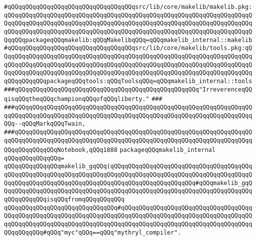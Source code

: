 \verb|#qQQqqQQqqQQqqQQqqQQqqQQqqQQqqQQqqQQqsrc/lib/core/makelib/makelib.pkg:qQQqqQQqqQQqqQQqqQQqqQQqqQQqqQQqqQQqqQQqqQQqqQQqqQQqqQQqqQQqqQQqqQQqqQQqqQQqqQQqqQQqqQQqqQQqqQQqqQQqqQQqqQQqqQQqqQQqqQQqqQQqqQQqqQQqqQQqqQQqqQQqqQQqqQQqqQQqqQQqqQQqqQQqqQQqqQQqqQQqqQQqqQQqqQQqqQQqqQQqqQQqqQQqqQQqqQQqpackageqQQqmakelib:qQQqMakelibqQQq=qQQqmakelib_internal::makelib|\newline
\verb|#qQQqqQQqqQQqqQQqqQQqqQQqqQQqqQQqqQQqsrc/lib/core/makelib/tools.pkg:qQQqqQQqqQQqqQQqqQQqqQQqqQQqqQQqqQQqqQQqqQQqqQQqqQQqqQQqqQQqqQQqqQQqqQQqqQQqqQQqqQQqqQQqqQQqqQQqqQQqqQQqqQQqqQQqqQQqqQQqqQQqqQQqqQQqqQQqqQQqqQQqqQQqqQQqqQQqqQQqqQQqqQQqqQQqqQQqqQQqqQQqqQQqqQQqqQQqqQQqqQQqqQQqqQQqqQQqqQQqqQQqpackageqQQqtools:qQQqToolsqQQq=qQQqmakelib_internal::tools|\newline
\newline
\newline
\newline
\verb|###qQQqqQQqqQQqqQQqqQQqqQQqqQQqqQQqqQQqqQQqqQQqqQQqqQQq"IrreverenceqQQqisqQQqtheqQQqchampionqQQqofqQQqliberty."|\newline
\verb|###|\newline
\verb|###qQQqqQQqqQQqqQQqqQQqqQQqqQQqqQQqqQQqqQQqqQQqqQQqqQQqqQQqqQQqqQQqqQQqqQQqqQQqqQQqqQQqqQQqqQQqqQQqqQQqqQQqqQQqqQQqqQQqqQQqqQQqqQQqqQQqqQQqqQQq--qQQqMarkqQQqTwain,|\newline
\verb|###qQQqqQQqqQQqqQQqqQQqqQQqqQQqqQQqqQQqqQQqqQQqqQQqqQQqqQQqqQQqqQQqqQQqqQQqqQQqqQQqqQQqqQQqqQQqqQQqqQQqqQQqqQQqqQQqqQQqqQQqqQQqqQQqqQQqqQQqqQQqqQQqqQQqqQQqNotebook,qQQq1888|\newline
\newline
\newline
\newline
\newline
\newline
\verb|packageqQQqmakelib_internal|\newline
\verb|qQQqqQQqqQQqqQQq=|\newline
\verb|qQQqqQQqqQQqqQQqmakelib_gqQQq(qQQqqQQqqQQqqQQqqQQqqQQqqQQqqQQqqQQqqQQqqQQqqQQqqQQqqQQqqQQqqQQqqQQqqQQqqQQqqQQqqQQqqQQqqQQqqQQqqQQqqQQqqQQqqQQqqQQqqQQqqQQqqQQqqQQqqQQqqQQqqQQqqQQqqQQqqQQqqQQqqQQq#qQQqmakelib_gqQQqqQQqqQQqqQQqqQQqqQQqqQQqqQQqqQQqqQQqqQQqqQQqqQQqqQQqqQQqqQQqqQQqqQQqqQQqqQQqqQQqisqQQqfromqQQqqQQqqQQq|\newline
\verb|qQQqqQQqqQQqqQQqqQQqqQQqqQQqqQQq#qQQqqQQqqQQqqQQqqQQqqQQqqQQqqQQqqQQqqQQqqQQqqQQqqQQqqQQqqQQqqQQqqQQqqQQqqQQqqQQqqQQqqQQqqQQqqQQqqQQqqQQqqQQqqQQqqQQqqQQqqQQqqQQqqQQqqQQqqQQqqQQqqQQqqQQqqQQqqQQqqQQqqQQqqQQqqQQqqQQqqQQqqQQq#qQQq"myc"qQQq==qQQq"mythryl_compiler".|\newline
